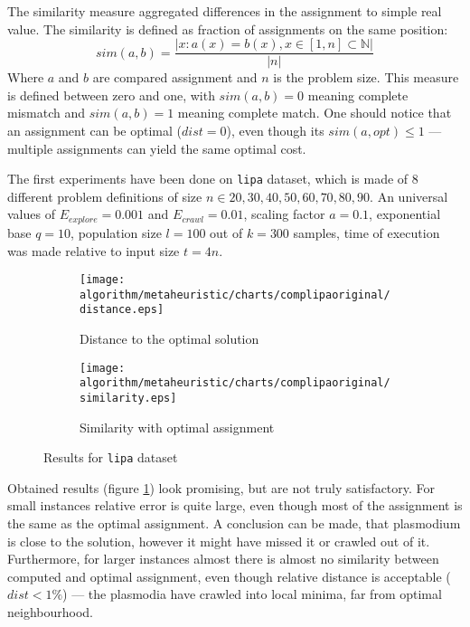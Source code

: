 The similarity measure aggregated differences in the assignment to simple real value. The similarity is defined as fraction of assignments on the same position:
\begin{equation}
  sim(a, b) = \frac{| x : a(x) = b(x), x \in [1, n] \subset \mathbb{N}|}{|n|}
\end{equation}
Where $a$ and $b$ are compared assignment and $n$ is the problem size. This measure is defined between zero and one, with $sim(a, b) = 0$ meaning complete mismatch and $sim(a, b) = 1$ meaning complete match. One should notice that an assignment can be optimal ($dist=0$), even though its $sim(a, opt) \leq 1$ --- multiple assignments can yield the same optimal cost.

The first experiments have been done on \texttt{lipa} dataset, which is made of 8 different problem definitions of size $n \in {20, 30, 40, 50, 60, 70, 80, 90}$. An universal values of $E_{explore}=0.001$ and $E_{crawl}=0.01$, scaling factor $a=0.1$, exponential base $q=10$, population size $l=100$ out of $k=300$ samples, time of execution was made relative to input size $t=4n$.

\begin{figure}
  \centering

  \begin{subfigure}{0.47\textwidth}
    \texttt{[image: algorithm/metaheuristic/charts/complipaoriginal/distance.eps]}
    \caption{Distance to the optimal solution}
  \end{subfigure}
  \begin{subfigure}{0.47\textwidth}
    \texttt{[image: algorithm/metaheuristic/charts/complipaoriginal/similarity.eps]}
    \caption{Similarity with optimal assignment}
  \end{subfigure}
  
  \caption{Results for \texttt{lipa} dataset}
  \label{figure:am_lipa_results}
\end{figure}

Obtained results (figure \ref{figure:am_lipa_results}) look promising, but are not truly satisfactory. For small instances relative error is quite large, even though most of the assignment is the same as the optimal assignment. A conclusion can be made, that plasmodium is close to the solution, however it might have missed it or crawled out of it. Furthermore, for larger instances almost there is almost no similarity between computed and optimal assignment, even though relative distance is acceptable ($dist < 1\%$) --- the plasmodia have crawled into local minima, far from optimal neighbourhood.

